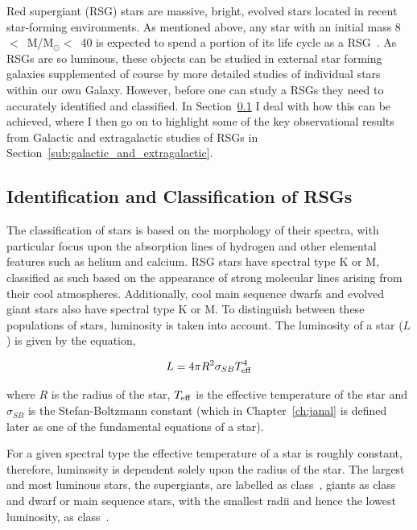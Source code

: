 {Red supergiant (RSG) stars are massive, bright, evolved stars located in recent star-forming environments.
As mentioned above, any star with an initial mass 8~$<$~M/M$_{\odot}<$~40 is expected to spend a portion of its life cycle as a RSG~\citep{2000A&A...361..101M,Massey03, 2007ARA&A..45..177C, Meynet11}.
As RSGs are so luminous, these objects can be studied in external star forming galaxies supplemented of course by more detailed studies of individual stars within our own Galaxy.
However, before one can study a RSGs they need to accurately identified and classified. In Section~\ref{sub:selection_of_rsgs} I deal with how this can be achieved, where I then go on to highlight some of the key observational results from Galactic and extragalactic studies of RSGs in Section~\ref{sub:galactic_and_extragalactic}.

\subsection{Identification and Classification of RSGs} %
\label{sub:selection_of_rsgs}

The classification of stars is based on the morphology of their spectra, with particular focus upon the absorption lines of hydrogen and other elemental features such as helium and calcium.
RSG stars have spectral type K or M, classified as such based on the appearance of strong molecular lines arising from their cool atmospheres.
Additionally, cool main sequence dwarfs and evolved giant stars also have spectral type K or M.
To distinguish between these populations of stars, luminosity is taken into account.
The luminosity of a star ($L$) is given by the equation,

\begin{equation}
    L = 4\pi R^2\sigma_{SB}T_{\rm eff}^4
\end{equation}

\noindent where $R$ is the radius of the star, $T_{\rm eff}$ is the effective temperature of the star and $\sigma_{SB}$ is the Stefan-Boltzmann constant (which in Chapter~\ref{ch:janal} is defined later as one of the fundamental equations of a star).

For a given spectral type the effective temperature of a star is roughly constant, therefore, luminosity is dependent solely upon the radius of the star.
The largest and most luminous stars, the supergiants, are labelled as class~\1, giants as class~\3 and dwarf or main sequence stars, with the smallest radii and hence the lowest luminosity, as class~\5.

}
